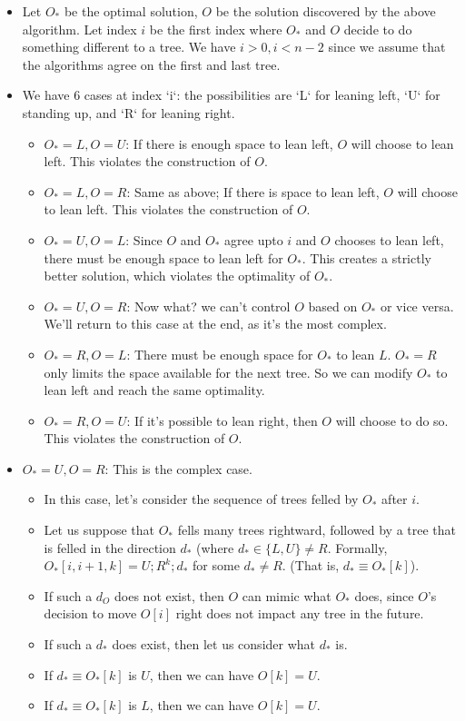 \documentclass[14pt]{report}
\begin{document}
\begin{itemize}
\item Let $O_*$ be the optimal solution, $O$ be the solution discovered by the
    above algorithm.  Let index $i$ be the first index where $O_*$ and $O$
        decide to do something different to a tree.  We have $i > 0, i < n-2$
        since we assume that the algorithms agree on the first and last tree.
\item We have  6 cases at index `i`: the possibilities are `L` for leaning left, `U` for standing up, and `R` for leaning right.
\begin{itemize}
\item  $O_*=L, O=U$: If there is enough space to lean left, $O$ will choose to
    lean left. This violates the construction of $O$.
\item  $O_*=L, O=R$: Same as above; If there is space to lean left, $O$ will
    choose to lean left. This violates the construction of $O$.
\item  $O_*=U, O=L$: Since $O$ and $O_*$ agree upto $i$ and $O$ chooses to lean
    left, there must be enough space to lean left for $O_*$. This creates a
        strictly better solution,  which violates the optimality of $O_*$.
\item $O_*=U, O=R$: Now what? we can't control $O$ based on $O_*$ or vice
    versa.  We'll return to this case at the end, as it's the most complex.
\item $O_*=R, O=L$: There must be enough space for $O_*$ to lean $L$. $O_*=R$
    only limits the space available for the next tree. So we can modify $O_*$
        to lean left and reach the same optimality.
\item $O_*=R, O=U$: If it's possible to lean right, then $O$ will choose to do
    so. This violates the construction of $O$.
\end{itemize}
\item $O_*=U, O=R$: This is the complex case.
    \begin{itemize}
            \item In this case, let's consider the sequence of trees felled by $O_*$ after $i$.
            \item Let us suppose that $O_*$ fells many trees rightward,
                followed by a tree that is felled in the direction $d_*$ (where
                $d_* \in \{L, U \} \neq R$.  Formally, $O_*[i, i+1, k] = U; R^k; d_*$ for
                some $d_* \neq R$. (That is, $d_* \equiv O_*[k]$).
            \item If such a $d_O$ does not exist, then $O$ can
                mimic what $O_*$ does, since $O$'s decision to move $O[i]$ right does not impact any tree in the future.
            \item If such a $d_*$ does exist, then let us consider what $d_*$ is.
            \item If $d_* \equiv O_*[k]$ is $U$, then we can have $O[k] = U$.
            \item If $d_* \equiv O_*[k]$ is $L$, then we can have $O[k] = U$.
    \end{itemize}
\end{itemize}
\end{document}
